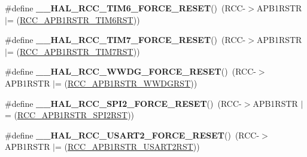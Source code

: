 \begin{DoxyCompactItemize}
\item 
\hypertarget{group___r_c_c___a_p_b1___force___release___reset_ga3446c3ea4d5e101b591fcb0222d0fb10}{\#define {\bfseries \-\_\-\-\_\-\-H\-A\-L\-\_\-\-R\-C\-C\-\_\-\-T\-I\-M6\-\_\-\-F\-O\-R\-C\-E\-\_\-\-R\-E\-S\-E\-T}()~(R\-C\-C-\/$>$A\-P\-B1\-R\-S\-T\-R $\vert$= (\hyperlink{group___peripheral___registers___bits___definition_ga8d64bd82cf47a209afebc7d663e28383}{R\-C\-C\-\_\-\-A\-P\-B1\-R\-S\-T\-R\-\_\-\-T\-I\-M6\-R\-S\-T}))}\label{group___r_c_c___a_p_b1___force___release___reset_ga3446c3ea4d5e101b591fcb0222d0fb10}

\item 
\hypertarget{group___r_c_c___a_p_b1___force___release___reset_ga350e60b0e21e094ff1624e1da9855e65}{\#define {\bfseries \-\_\-\-\_\-\-H\-A\-L\-\_\-\-R\-C\-C\-\_\-\-T\-I\-M7\-\_\-\-F\-O\-R\-C\-E\-\_\-\-R\-E\-S\-E\-T}()~(R\-C\-C-\/$>$A\-P\-B1\-R\-S\-T\-R $\vert$= (\hyperlink{group___peripheral___registers___bits___definition_ga40b1d355ee76ad9a044ad37f1629e760}{R\-C\-C\-\_\-\-A\-P\-B1\-R\-S\-T\-R\-\_\-\-T\-I\-M7\-R\-S\-T}))}\label{group___r_c_c___a_p_b1___force___release___reset_ga350e60b0e21e094ff1624e1da9855e65}

\item 
\hypertarget{group___r_c_c___a_p_b1___force___release___reset_gaf60e74dcb0fdadafd6b4762aa81fc409}{\#define {\bfseries \-\_\-\-\_\-\-H\-A\-L\-\_\-\-R\-C\-C\-\_\-\-W\-W\-D\-G\-\_\-\-F\-O\-R\-C\-E\-\_\-\-R\-E\-S\-E\-T}()~(R\-C\-C-\/$>$A\-P\-B1\-R\-S\-T\-R $\vert$= (\hyperlink{group___peripheral___registers___bits___definition_ga0d2591ac0655a8798f4c16cef97e6f94}{R\-C\-C\-\_\-\-A\-P\-B1\-R\-S\-T\-R\-\_\-\-W\-W\-D\-G\-R\-S\-T}))}\label{group___r_c_c___a_p_b1___force___release___reset_gaf60e74dcb0fdadafd6b4762aa81fc409}

\item 
\hypertarget{group___r_c_c___a_p_b1___force___release___reset_ga869e4f5c1132e3dfce084099cf454c51}{\#define {\bfseries \-\_\-\-\_\-\-H\-A\-L\-\_\-\-R\-C\-C\-\_\-\-S\-P\-I2\-\_\-\-F\-O\-R\-C\-E\-\_\-\-R\-E\-S\-E\-T}()~(R\-C\-C-\/$>$A\-P\-B1\-R\-S\-T\-R $\vert$= (\hyperlink{group___peripheral___registers___bits___definition_ga0a6289a35547cf0d5300706f9baa18ea}{R\-C\-C\-\_\-\-A\-P\-B1\-R\-S\-T\-R\-\_\-\-S\-P\-I2\-R\-S\-T}))}\label{group___r_c_c___a_p_b1___force___release___reset_ga869e4f5c1132e3dfce084099cf454c51}

\item 
\hypertarget{group___r_c_c___a_p_b1___force___release___reset_gab4de80173ffa0e599baab0e76d562cc3}{\#define {\bfseries \-\_\-\-\_\-\-H\-A\-L\-\_\-\-R\-C\-C\-\_\-\-U\-S\-A\-R\-T2\-\_\-\-F\-O\-R\-C\-E\-\_\-\-R\-E\-S\-E\-T}()~(R\-C\-C-\/$>$A\-P\-B1\-R\-S\-T\-R $\vert$= (\hyperlink{group___peripheral___registers___bits___definition_ga195c39f08384ca1fa13b53a31d65d0a5}{R\-C\-C\-\_\-\-A\-P\-B1\-R\-S\-T\-R\-\_\-\-U\-S\-A\-R\-T2\-R\-S\-T}))}\label{group___r_c_c___a_p_b1___force___release___reset_gab4de80173ffa0e599baab0e76d562cc3}


\end{DoxyCompactItemize}
